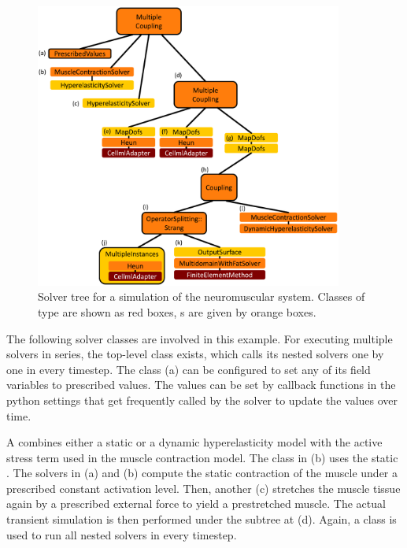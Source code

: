 \begin{figure}
  \centering%
  \includegraphics[width=0.9\textwidth]{images/implementation/solver_tree_multidomain_spindles.pdf}%
  \caption{Solver tree for a simulation of the neuromuscular system. Classes of type  are shown as red boxes, s are given by orange boxes.}%
  \label{fig:solver_tree_multidomain_spindles}%
\end{figure}

The following solver classes are involved in this example. For executing multiple solvers in series, the top-level  class exists, which calls its nested solvers one by one in every timestep.
The  class (a) can be configured to set any of its field variables to prescribed values. The values can be set by callback functions in the python settings that get frequently called by the solver to update the values over time.

A  combines either a static or a dynamic hyperelasticity model with the active stress term used in the muscle contraction model. The class in (b) uses the static . The solvers in (a) and (b) compute the static contraction of the muscle under a prescribed constant activation level. Then, another  (c) stretches the muscle tissue again by a prescribed external force to yield a prestretched muscle. The actual transient simulation is then performed under the subtree at (d). 
Again, a  class is used to run all nested solvers in every timestep.

